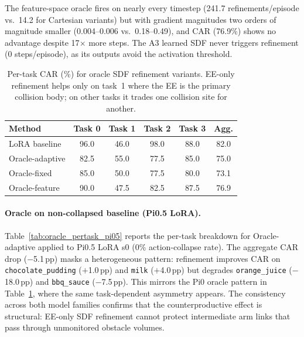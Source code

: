 The feature-space oracle fires on nearly every timestep (241.7 refinements/episode vs.\ 14.2 for Cartesian variants) but with gradient magnitudes two orders of magnitude smaller (0.004--0.006 vs.\ 0.18--0.49), and CAR (76.9\%) shows no advantage despite 17$\times$ more steps. The A3 learned SDF never triggers refinement (0 steps/episode), as its outputs avoid the activation threshold.

\begin{table}[h]
\centering
\caption{Per-task CAR (\%) for oracle SDF refinement variants. EE-only refinement helps only on task~1 where the EE is the primary collision body; on other tasks it trades one collision site for another.}
\label{tab:oracle_pertask}
\vspace{2pt}
\footnotesize
\begin{tabular*}{\columnwidth}{l@{\extracolsep{\fill}}ccccc}
\toprule
Method & Task 0 & Task 1 & Task 2 & Task 3 & Agg. \\
\midrule
LoRA baseline & 96.0 & 46.0 & 98.0 & 88.0 & 82.0 \\
\midrule
Oracle-adaptive & 82.5 & 55.0 & 77.5 & 85.0 & 75.0 \\
Oracle-fixed & 85.0 & 50.0 & 77.5 & 80.0 & 73.1 \\
Oracle-feature & 90.0 & 47.5 & 82.5 & 87.5 & 76.9 \\
\bottomrule
\end{tabular*}
\end{table}


\paragraph{Oracle on non-collapsed baseline (Pi0.5 LoRA).}
Table~\ref{tab:oracle_pertask_pi05} reports the per-task breakdown for Oracle-adaptive applied to Pi0.5 LoRA s0 (0\% action-collapse rate). The aggregate CAR drop ($-$5.1\,pp) masks a heterogeneous pattern: refinement improves CAR on \texttt{chocolate\_pudding} ($+$1.0\,pp) and \texttt{milk} ($+$4.0\,pp) but degrades \texttt{orange\_juice} ($-$18.0\,pp) and \texttt{bbq\_sauce} ($-$7.5\,pp). This mirrors the Pi0 oracle pattern in Table~\ref{tab:oracle_pertask}, where the same task-dependent asymmetry appears. The consistency across both model families confirms that the counterproductive effect is structural: EE-only SDF refinement cannot protect intermediate arm links that pass through unmonitored obstacle volumes.

